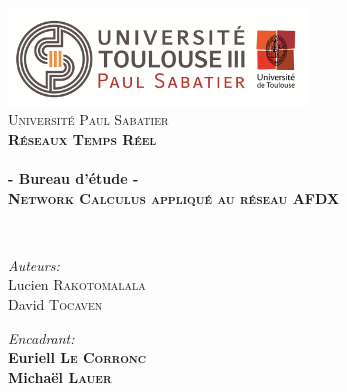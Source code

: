 
\begin{titlepage}
\begin{center}


\includegraphics[width=0.60\textwidth]{./page_de_garde/logo_ups.png}~\\[1cm]

\textsc{\LARGE Université Paul Sabatier}\\[1.5cm]

\textsc{\Large \bf Réseaux Temps Réel }\\[0.5cm]

\HRule \\[0.4cm]

{\huge \bfseries  - Bureau d'étude - \\
\vspace{3mm}
 \textsc{Network Calculus appliqué au réseau AFDX} }

\HRule \\[1.5cm]

\begin{minipage}{0.4\textwidth}
\begin{flushleft} \large
\emph{Auteurs:}\\
Lucien \textsc{Rakotomalala}\\
David \textsc{Tocaven}\\
\end{flushleft}
\end{minipage}
\begin{minipage}{0.58\textwidth}
\begin{flushright} \large
\emph{Encadrant:} \\
\textbf{ Euriell \textsc{Le Corronc}}\\
\textbf{ Michaël \textsc{Lauer}}
\end{flushright}
\end{minipage}
\newline
\newline


\end{center}
\end{titlepage}
